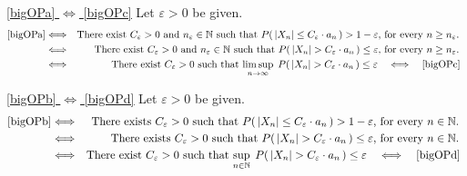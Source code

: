 \vskip 0.3cm
\noindent
\underline{\eqref{bigOPa} $\Longleftrightarrow$ \eqref{bigOPc}}\quad
Let $\varepsilon > 0$ be given.
\begin{eqnarray*}
\eqref{bigOPa}
&\Longleftrightarrow&
\textnormal{There exist $C_{\varepsilon} > 0$ and $n_{\varepsilon} \in \mathbb{N}$ such that
$P\!\left(\,|X_{n}| \leq C_{\varepsilon}\cdot a_{n}\,\right) > 1 - \varepsilon$, for every $n \geq n_{\varepsilon}$.
}
\\
&\Longleftrightarrow&
\textnormal{There exist $C_{\varepsilon} > 0$ and $n_{\varepsilon} \in \mathbb{N}$ such that
$P\!\left(\,|X_{n}| > C_{\varepsilon}\cdot a_{n}\,\right) \leq \varepsilon$, for every $n \geq n_{\varepsilon}$.
}
\\
&\Longleftrightarrow&
\textnormal{There exist $C_{\varepsilon} > 0$ such that
$\limsup_{n \rightarrow \infty}\;P\!\left(\,|X_{n}| > C_{\varepsilon}\cdot a_{n}\,\right) \leq \varepsilon
\quad\Longleftrightarrow\quad \eqref{bigOPc}$
}
\end{eqnarray*}

\vskip 0.3cm
\noindent
\underline{\eqref{bigOPb} $\Longleftrightarrow$ \eqref{bigOPd}}\quad
Let $\varepsilon > 0$ be given.
\begin{eqnarray*}
\eqref{bigOPb}
&\Longleftrightarrow&
\textnormal{There exists $C_{\varepsilon} > 0$ such that
$P\!\left(\,|X_{n}| \leq C_{\varepsilon}\cdot a_{n}\,\right) > 1 - \varepsilon$, for every $n \in \mathbb{N}$.
}
\\
&\Longleftrightarrow&
\textnormal{There exists $C_{\varepsilon} > 0$ such that
$P\!\left(\,|X_{n}| > C_{\varepsilon}\cdot a_{n}\,\right) \leq \varepsilon$, for every $n \in \mathbb{N}$.
}
\\
&\Longleftrightarrow&
\textnormal{There exist $C_{\varepsilon} > 0$ such that
$\sup_{n \in \mathbb{N}}\;P\!\left(\,|X_{n}| > C_{\varepsilon}\cdot a_{n}\,\right) \leq \varepsilon
\quad\Longleftrightarrow\quad \eqref{bigOPd}$
}
\end{eqnarray*}

